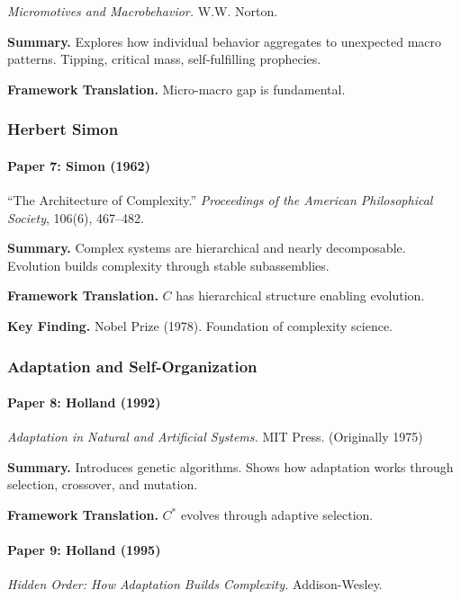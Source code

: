 \textit{Micromotives and Macrobehavior.}
W.W. Norton.

\textbf{Summary.}
Explores how individual behavior aggregates to unexpected macro patterns.
Tipping, critical mass, self-fulfilling prophecies.

\textbf{Framework Translation.}
Micro-macro gap is fundamental.

\subsubsection{Herbert Simon}

\paragraph{Paper 7: Simon (1962)}

``The Architecture of Complexity.''
\textit{Proceedings of the American Philosophical Society}, 106(6), 467--482.

\textbf{Summary.}
Complex systems are hierarchical and nearly decomposable.
Evolution builds complexity through stable subassemblies.

\textbf{Framework Translation.}
$C$ has hierarchical structure enabling evolution.

\textbf{Key Finding.}
Nobel Prize (1978). Foundation of complexity science.

\subsubsection{Adaptation and Self-Organization}

\paragraph{Paper 8: Holland (1992)}

\textit{Adaptation in Natural and Artificial Systems.}
MIT Press. (Originally 1975)

\textbf{Summary.}
Introduces genetic algorithms. Shows how adaptation works through 
selection, crossover, and mutation.

\textbf{Framework Translation.}
$C^*$ evolves through adaptive selection.

\paragraph{Paper 9: Holland (1995)}

\textit{Hidden Order: How Adaptation Builds Complexity.}
Addison-Wesley.

